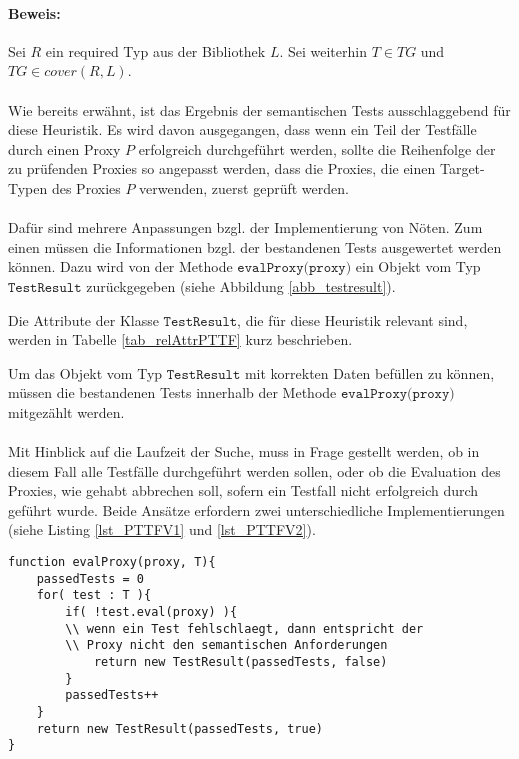 \documentclass[a4paper,12pt]{article}
\begin{document}
\paragraph{Beweis:}
Sei $R$ ein required Typ aus der Bibliothek $L$. Sei weiterhin $T \in \mathit{TG}$ und $\mathit{TG} \in \mathit{cover(R,L)}$.
\\\\
Wie bereits erwähnt, ist das Ergebnis der semantischen Tests ausschlaggebend für diese Heuristik. Es wird davon ausgegangen, dass wenn ein Teil der Testfälle durch einen Proxy $P$ erfolgreich durchgeführt werden, sollte die Reihenfolge der zu prüfenden Proxies so angepasst werden, dass die Proxies, die einen Target-Typen des Proxies $P$ verwenden, zuerst geprüft werden.\\\\
Dafür sind mehrere Anpassungen bzgl. der Implementierung von Nöten. 
Zum einen müssen die Informationen bzgl. der bestandenen Tests ausgewertet werden können. Dazu wird von der Methode $\texttt{evalProxy(proxy)}$ ein Objekt vom Typ $\texttt{TestResult}$ zurückgegeben (siehe Abbildung \ref{abb_testresult}).
\begin{figure}

\end{figure}\label{abb_testresult}
\noindent
Die Attribute der Klasse $\texttt{TestResult}$, die für diese Heuristik relevant sind, werden in Tabelle \ref{tab_relAttrPTTF} kurz beschrieben.
\begin{table}

\end{table}\label{tab_relAttrPTTF}
\noindent
Um das Objekt vom Typ $\texttt{TestResult}$ mit korrekten Daten befüllen zu können, müssen die bestandenen Tests innerhalb der Methode $\texttt{evalProxy(proxy)}$ mitgezählt werden.\\\\
Mit Hinblick auf die Laufzeit der Suche, muss in Frage gestellt werden, ob in diesem Fall alle Testfälle durchgeführt werden sollen, oder ob die Evaluation des Proxies, wie gehabt abbrechen soll, sofern ein Testfall nicht erfolgreich durch geführt wurde. Beide Ansätze erfordern zwei unterschiedliche Implementierungen (siehe Listing \ref{lst_PTTFV1} und \ref{lst_PTTFV2}).
\begin{lstlisting}[style = pseudo, caption = Variante 1: Abbruch bei fehlschlagendem Test, captionpos = b]
function evalProxy(proxy, T){
	passedTests = 0
	for( test : T ){
		if( !test.eval(proxy) ){
		\\ wenn ein Test fehlschlaegt, dann entspricht der 
		\\ Proxy nicht den semantischen Anforderungen
			return new TestResult(passedTests, false)
		}
		passedTests++
	}
	return new TestResult(passedTests, true)
}
\end{lstlisting}\label{lst_PTTFV1}
\end{document}
